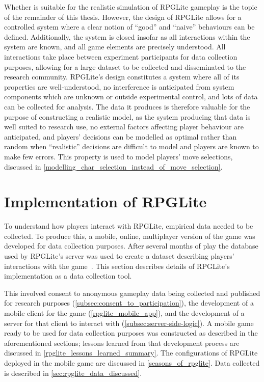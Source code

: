 Whether \aspectorientation is suitable for the realistic simulation of RPGLite
gameplay is the topic of the remainder of this thesis. However, the design of
RPGLite allows for a controlled system where a clear notion of ``good'' and
``naive'' behaviours can be defined. Additionally, the system is closed insofar
as all interactions within the system are known, and all game elements are
precisely understood. All interactions take place between experiment
participants for data collection purposes, allowing for a large dataset to be
collected and disseminated to the research community. RPGLite's design
constitutes a system where all of its properties are well-understood, no
interference is anticipated from system components which are unknown or outside
experimental control, and lots of data can be collected for analysis.
The data it produces is therefore valuable for the purpose of constructing a
realistic model, as the system producing that data is well suited to research
use, no external factors affecting player behaviour are anticipated, and players'
decisions can be modelled as optimal rather than random when ``realistic''
decisions are difficult to model and players are known to make few
errors. This property is used to model players' move
selections, discussed in \cref{modelling_char_selection_instead_of_move_selection}.



\section{Implementation of RPGLite}\label{sec:rpglite_implementation}

To understand how players interact with RPGLite, empirical data needed to be
collected. To produce this, a mobile, online, multiplayer version of the game
was developed for data collection purposes. After several months of play the
database used by RPGLite's server was used to create a dataset describing
players' interactions with the game~\cite{rpglite_dataset}. This section
describes details of RPGLite's implementation as a data collection tool.

This involved consent to anonymous gameplay data being collected and published
for research purposes (\cref{subsec:consent_to_participation}), the development
of a mobile client for the game (\cref{rpglite_mobile_app}), and the development
of a server for that client to interact with (\cref{subsec:server-side-logic}).
A mobile game ready to be used for data collection purposes was constructed as
described in the aforementioned sections; lessons learned from that development
process are discussed in \cref{rpglite_lessons_learned_summary}. The
configurations of RPGLite deployed in the mobile game are discussed in
\cref{seasons_of_rpglite}. Data collected is described in
\cref{sec:rpglite_data_discussed}.


